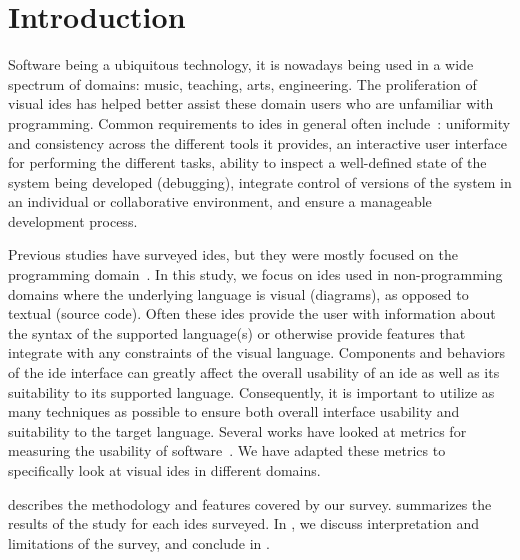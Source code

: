 \section{Introduction} \label{sec:introduction}

Software being a ubiquitous technology, it is nowadays being used in a wide spectrum of domains: music, teaching, arts, engineering.
The proliferation of visual \acfp{ide} has helped better assist these domain users who are unfamiliar with programming.
Common requirements to \acp{ide} in general often include~\cite{habermann1986}: uniformity and consistency across the different tools it provides, an interactive user interface for performing the different tasks, ability to inspect a well-defined state of the system being developed (\eg debugging), integrate control of versions of the system in an individual or collaborative environment, and ensure a manageable development process.

Previous studies have surveyed \acp{ide}, but they were mostly focused on the
programming domain~\cite{hils1992, fischer1994, habermann1986}.
In this study, we focus on \acp{ide} used in non-programming domains where the underlying language is visual (\eg diagrams), as opposed to textual (\eg source code).
Often these \acp{ide} provide the user with information about the syntax of the supported language(s) or otherwise provide features that integrate with any constraints of the visual language.
Components and behaviors of the \ac{ide} interface can greatly affect the overall usability of an \ac{ide} as well as its suitability to its supported language.
Consequently, it is important to utilize as many techniques as possible to ensure both overall interface usability and suitability to the target language.
Several works have looked at metrics for measuring the usability of
software~\cite{constantine1996}.
We have adapted these metrics to specifically look at visual \acp{ide} in different domains.

 describes the methodology and features covered by our survey.
 summarizes the results of the study for each \acp{ide} surveyed.
In , we discuss interpretation and limitations of the survey, and conclude in .

